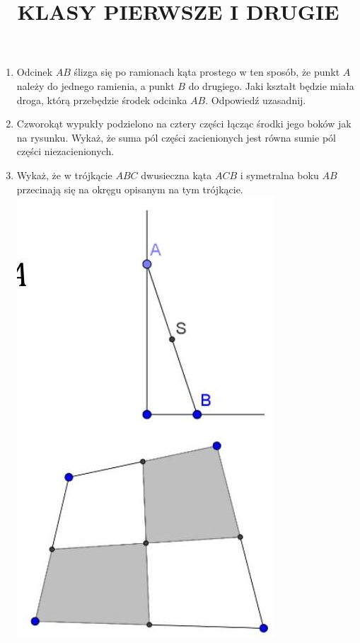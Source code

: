 \documentclass[10pt]{article}
\title{KLASY PIERWSZE I DRUGIE }
\author{}
\date{}
\begin{document}
\maketitle
\begin{enumerate}
  \item Odcinek \(A B\) ślizga się po ramionach kąta prostego w ten sposób, że punkt \(A\) należy do jednego ramienia, a punkt \(B\) do drugiego. Jaki kształt będzie miała droga, którą przebędzie środek odcinka \(A B\). Odpowiedź uzasadnij.
  \item Czworokąt wypukły podzielono na cztery części łącząc środki jego boków jak na rysunku. Wykaż, że suma pól części zacienionych jest równa sumie pól części niezacienionych.
  \item Wykaż, że w trójkącie \(A B C\) dwusieczna kąta \(A C B\) i symetralna boku \(A B\) przecinają się na okręgu opisanym na tym trójkącie.\\
\includegraphics[max width=\textwidth, center]{2024_11_21_219d6f5dddf91235b0b5g-1(1)}
\end{enumerate}
\end{document}
